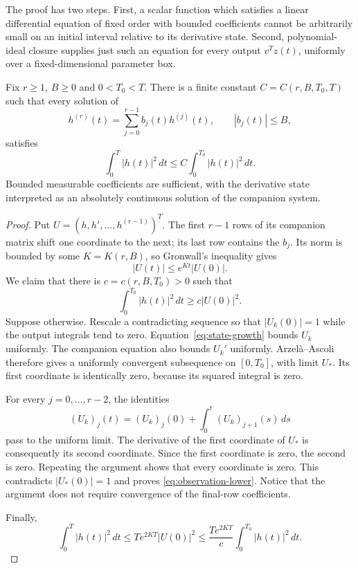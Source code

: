 The proof has two steps. First, a scalar function which satisfies a linear differential equation of fixed order with bounded coefficients cannot be arbitrarily small on an initial interval relative to its derivative state. Second, polynomial-ideal closure supplies just such an equation for every output $v^Tz(t)$, uniformly over a fixed-dimensional parameter box.

\begin{lemma}
\label{lem:companion}
Fix $r\geq1$, $B\geq0$ and $0<T_0<T$. There is a finite constant $C=C(r,B,T_0,T)$ such that every solution of
\begin{equation}
 h^{(r)}(t)=\sum_{j=0}^{r-1}b_j(t)h^{(j)}(t),
 \qquad |b_j(t)|\leq B,
 \label{eq:scalar}
\end{equation}
satisfies
\[
 \int_0^T|h(t)|^2\,dt
 \leq C\int_0^{T_0}|h(t)|^2\,dt.
\]
Bounded measurable coefficients are sufficient, with the derivative state interpreted as an absolutely continuous solution of the companion system.
\end{lemma}

\begin{proof}
Put $U=(h,h',\ldots,h^{(r-1)})^T$. The first $r-1$ rows of its companion matrix shift one coordinate to the next; its last row contains the $b_j$. Its norm is bounded by some $K=K(r,B)$, so Gronwall's inequality gives
\begin{equation}
 |U(t)|\leq e^{Kt}|U(0)|.
 \label{eq:state-growth}
\end{equation}
We claim that there is $c=c(r,B,T_0)>0$ such that
\begin{equation}
 \int_0^{T_0}|h(t)|^2\,dt\geq c|U(0)|^2.
 \label{eq:observation-lower}
\end{equation}
Suppose otherwise. Rescale a contradicting sequence so that $|U_k(0)|=1$ while the output integrals tend to zero. Equation~\eqref{eq:state-growth} bounds $U_k$ uniformly. The companion equation also bounds $U_k'$ uniformly. Arzelà--Ascoli therefore gives a uniformly convergent subsequence on $[0,T_0]$, with limit $U_*$. Its first coordinate is identically zero, because its squared integral is zero.

For every $j=0,\ldots,r-2$, the identities
\[
 (U_k)_j(t)=(U_k)_j(0)+\int_0^t(U_k)_{j+1}(s)\,ds
\]
pass to the uniform limit. The derivative of the first coordinate of $U_*$ is consequently its second coordinate. Since the first coordinate is zero, the second is zero. Repeating the argument shows that every coordinate is zero. This contradicts $|U_*(0)|=1$ and proves \eqref{eq:observation-lower}. Notice that the argument does not require convergence of the final-row coefficients.

Finally,
\[
 \int_0^T|h(t)|^2\,dt
 \leq Te^{2KT}|U(0)|^2
 \leq \frac{Te^{2KT}}c\int_0^{T_0}|h(t)|^2\,dt.
\]
\end{proof}

